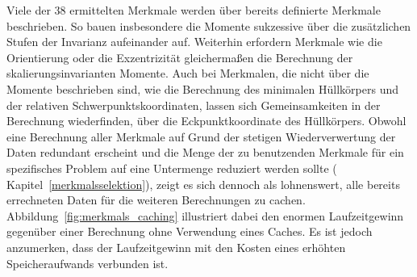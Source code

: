

Viele der $38$ ermittelten Merkmale werden über bereits definierte Merkmale beschrieben.
So bauen insbesondere die Momente sukzessive über die zusätzlichen Stufen der Invarianz aufeinander auf.
Weiterhin erfordern Merkmale wie die Orientierung oder die Exzentrizität gleichermaßen die Berechnung der skalierungsinvarianten Momente.
Auch bei Merkmalen, die nicht über die Momente beschrieben sind, wie \zB{} die Berechnung des minimalen Hüllkörpers und der relativen Schwerpunktskoordinaten, lassen sich Gemeinsamkeiten in der Berechnung wiederfinden, \zB{} über die Eckpunktkoordinate des Hüllkörpers.
Obwohl eine Berechnung aller Merkmale auf Grund der stetigen Wiederverwertung der Daten redundant erscheint und die Menge der zu benutzenden Merkmale für ein spezifisches Problem auf eine Untermenge reduziert werden sollte (\vgl{} Kapitel~\ref{merkmalsselektion}), zeigt es sich dennoch als lohnenswert, alle bereits errechneten Daten für die weiteren Berechnungen zu cachen.
Abbildung~\ref{fig:merkmals_caching} illustriert dabei den enormen Laufzeitgewinn gegenüber einer Berechnung ohne Verwendung eines Caches.
Es ist jedoch anzumerken, dass der Laufzeitgewinn mit den Kosten eines erhöhten Speicheraufwands verbunden ist.

